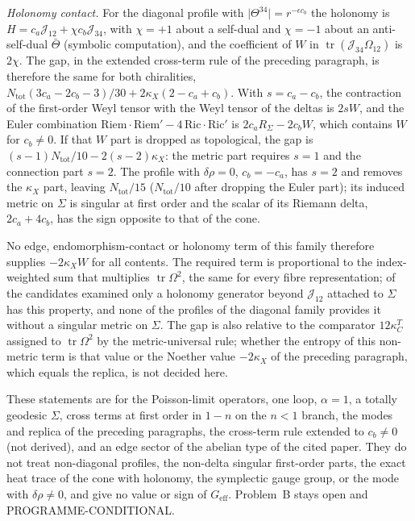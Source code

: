 \emph{Holonomy contact.} For the diagonal profile with \(\lvert\Theta^{34}\rvert=r^{-\epsilon c_b}\) the holonomy is \(H=c_a\mathcal J_{12}+\chi c_b\mathcal J_{34}\), with \(\chi=+1\) about a self-dual and \(\chi=-1\) about an anti-self-dual \(\bar\Theta\) (symbolic computation), and the coefficient of \(W\) in \(\operatorname{tr}(\mathcal J_{34}\Omega_{12})\) is \(2\chi\). The gap, in the extended cross-term rule of the preceding paragraph, is therefore the same for both chiralities, \(N_{\mathrm{tot}}(3c_a-2c_b-3)/30+2\kappa_X(2-c_a+c_b)\). With \(s=c_a-c_b\), the contraction of the first-order Weyl tensor with the Weyl tensor of the deltas is \(2sW\), and the Euler combination \(\mathrm{Riem}\cdot\mathrm{Riem}'-4\,\mathrm{Ric}\cdot\mathrm{Ric}'\) is \(2c_aR_\Sigma-2c_bW\), which contains \(W\) for \(c_b\neq0\). If that \(W\) part is dropped as topological, the gap is \((s-1)N_{\mathrm{tot}}/10-2(s-2)\kappa_X\): the metric part requires \(s=1\) and the connection part \(s=2\). The profile with \(\delta\rho=0\), \(c_b=-c_a\), has \(s=2\) and removes the \(\kappa_X\) part, leaving \(N_{\mathrm{tot}}/15\) (\(N_{\mathrm{tot}}/10\) after dropping the Euler part); its induced metric on \(\Sigma\) is singular at first order and the scalar of its Riemann delta, \(2c_a+4c_b\), has the sign opposite to that of the cone.



No edge, endomorphism-contact or holonomy term of this family therefore supplies \(-2\kappa_X W\) for all contents. The required term is proportional to the index-weighted sum that multiplies \(\operatorname{tr}\Omega^2\), the same for every fibre representation; of the candidates examined only a holonomy generator beyond \(\mathcal J_{12}\) attached to \(\Sigma\) has this property, and none of the profiles of the diagonal family provides it without a singular metric on \(\Sigma\). The gap is also relative to the comparator \(12\kappa_C^T\) assigned to \(\operatorname{tr}\Omega^2\) by the metric-universal rule; whether the entropy of this non-metric term is that value or the Noether value \(-2\kappa_X\) of the preceding paragraph, which equals the replica, is not decided here.



These statements are for the Poisson-limit operators, one loop, \(\alpha=1\), a totally geodesic \(\Sigma\), cross terms at first order in \(1-n\) on the \(n<1\) branch, the modes and replica of the preceding paragraphs, the cross-term rule extended to \(c_b\neq0\) (not derived), and an edge sector of the abelian type of the cited paper. They do not treat non-diagonal profiles, the non-delta singular first-order parts, the exact heat trace of the cone with holonomy, the symplectic gauge group, or the mode with \(\delta\rho\neq0\), and give no value or sign of \(G_{\mathrm{eff}}\). Problem~B stays open and PROGRAMME-CONDITIONAL.







